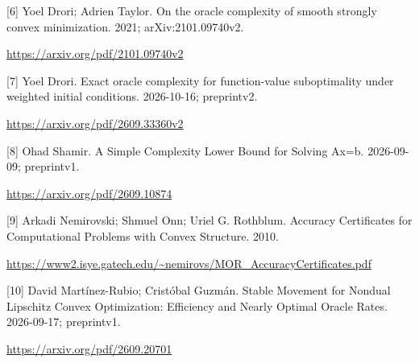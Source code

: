 \documentclass[10pt,a4paper]{article}
\begin{document}
[6] Yoel Drori; Adrien Taylor. On the oracle complexity of smooth strongly convex minimization. 2021; arXiv:2101.09740v2.

\url{https://arxiv.org/pdf/2101.09740v2}

[7] Yoel Drori. Exact oracle complexity for function-value suboptimality under weighted initial conditions. 2026-10-16; preprintv2.

\url{https://arxiv.org/pdf/2609.33360v2}

[8] Ohad Shamir. A Simple Complexity Lower Bound for Solving Ax=b. 2026-09-09; preprintv1.

\url{https://arxiv.org/pdf/2609.10874}

[9] Arkadi Nemirovski; Shmuel Onn; Uriel G. Rothblum. Accuracy Certificates for Computational Problems with Convex Structure. 2010.

\url{https://www2.isye.gatech.edu/~nemirovs/MOR_AccuracyCertificates.pdf}

[10] David Martínez-Rubio; Cristóbal Guzmán. Stable Movement for Nondual Lipschitz Convex Optimization: Efficiency and Nearly Optimal Oracle Rates. 2026-09-17; preprintv1.

\url{https://arxiv.org/pdf/2609.20701}
\end{document}
